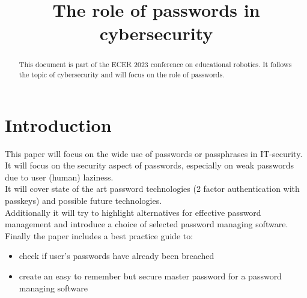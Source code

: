 \documentclass[conference]{IEEEtran}
\begin{document}
\title{The role of passwords in cybersecurity}
\author{
\and
{}
\and
{}
\and
{}
}
\maketitle

\begin{abstract}
This document is part of the ECER 2023 conference on educational robotics. It follows the topic of cybersecurity and will focus on the role of passwords.
\end{abstract}
\vspace{1cm}

\section{Introduction}
This paper will focus on the wide use of passwords or passphrases in IT-security. It will focus on the security aspect of passwords, especially on weak passwords due to user (human) laziness. \\
It will cover state of the art password technologies (2 factor authentication with passkeys) and possible future technologies.\\
Additionally it will try to highlight alternatives for effective password management and introduce a choice of selected password managing software. \\
Finally the paper includes a best practice guide to:
\begin{itemize}
\item check if user's passwords have already been breached 
\item create an easy to remember but secure master password for a password managing software
\end{itemize} 
\end{document}
